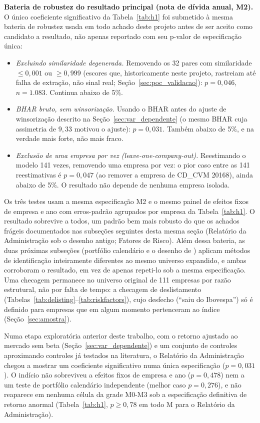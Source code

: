 \documentclass[a4paper,12pt]{report}
\begin{document}
\textbf{Bateria de robustez do resultado principal (nota de dívida anual, M2).} O único coeficiente significativo da Tabela~\ref{tab:h1} foi submetido à mesma bateria de robustez usada em todo achado deste projeto antes de ser aceito como candidato a resultado, não apenas reportado com seu p-valor de especificação única:
\begin{itemize}
    \item \textit{Excluindo similaridade degenerada.} Removendo os 32 pares com similaridade $\leq 0{,}001$ ou $\geq 0{,}999$ (escores que, historicamente neste projeto, rastreiam até falha de extração, não sinal real; Seção~\ref{sec:poc_validacao}): $p=0{,}046$, $n=1{.}083$. Continua abaixo de 5\%.
    \item \textit{BHAR bruto, sem winsorização.} Usando o BHAR antes do ajuste de winsorização descrito na Seção~\ref{sec:var_dependente} (o mesmo BHAR cuja assimetria de $9{,}33$ motivou o ajuste): $p=0{,}031$. Também abaixo de 5\%, e na verdade mais forte, não mais fraco.
    \item \textit{Exclusão de uma empresa por vez (\textit{leave-one-company-out}).} Reestimando o modelo 141 vezes, removendo uma empresa por vez: o pior caso entre as 141 reestimativas é $p=0{,}047$ (ao remover a empresa de CD\_CVM 20168), ainda abaixo de 5\%. O resultado não depende de nenhuma empresa isolada.
\end{itemize}
Os três testes usam a mesma especificação M2 e o mesmo painel de efeitos fixos de empresa e ano com erros-padrão agrupados por empresa da Tabela~\ref{tab:h1}. O resultado sobrevive a todos, um padrão bem mais robusto do que os achados frágeis documentados nas subseções seguintes desta mesma seção (Relatório da Administração sob o desenho antigo; Fatores de Risco). Além dessa bateria, as duas próximas subseções (portfólio calendário e o desenho de ) aplicam métodos de identificação inteiramente diferentes ao mesmo universo expandido, e ambas corroboram o resultado, em vez de apenas repeti-lo sob a mesma especificação. Uma checagem permanece no universo original de 111 empresas por razão estrutural, não por falta de tempo: a checagem de deslistamento (Tabelas~\ref{tab:delisting}--\ref{tab:riskfactors}), cujo desfecho (``saiu do Ibovespa'') só é definido para empresas que em algum momento pertenceram ao índice (Seção~\ref{sec:amostra}).

Numa etapa exploratória anterior deste trabalho, com o retorno ajustado ao mercado sem beta (Seção~\ref{sec:var_dependente}) e um conjunto de controles aproximando controles já testados na literatura, o Relatório da Administração chegou a mostrar um coeficiente significativo numa única especificação ($p=0{,}031$). O indício não sobreviveu a efeitos fixos de empresa e ano ($p=0{,}478$) nem a um teste de portfólio calendário independente (melhor caso $p=0{,}276$), e não reaparece em nenhuma célula da grade M0-M3 sob a especificação definitiva de retorno anormal (Tabela~\ref{tab:h1}, $p \geq 0{,}78$ em todo M para o Relatório da Administração).
\end{document}
